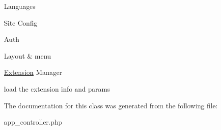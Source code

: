 \-Languages

\-Site \-Config

\-Auth

\-Layout \& menu

\hyperlink{class_extension}{\-Extension} \-Manager

load the extension info and params

\-The documentation for this class was generated from the following file\-:\begin{DoxyCompactItemize}
\item 
app\-\_\-controller.\-php\end{DoxyCompactItemize}
